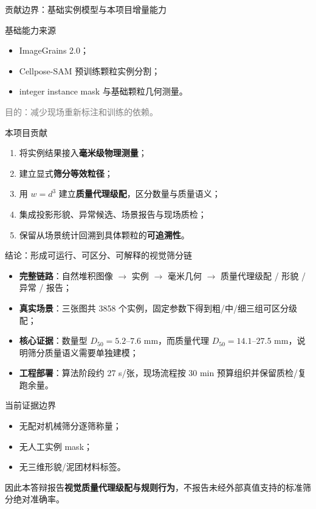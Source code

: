 \documentclass[UTF8,aspectratio=169,11pt]{ctexbeamer}
\newcommand{\key}[1]{\textcolor{accentblue}{\textbf{#1}}}
\newcommand{\smallgray}[1]{{\scriptsize\textcolor{gray}{#1}}}
\begin{document}
\begin{frame}{贡献边界：基础实例模型与本项目增量能力}
\begin{block}{基础能力来源}
\small
\begin{itemize}
  \item ImageGrains 2.0；
  \item Cellpose-SAM 预训练颗粒实例分割；
  \item integer instance mask 与基础颗粒几何测量。
\end{itemize}
\end{block}
\smallgray{目的：减少现场重新标注和训练的依赖。}
\vspace{0.4em}

\begin{alertblock}{本项目贡献}
\small
\begin{enumerate}
  \item 将实例结果接入\textbf{毫米级物理测量}；
  \item 建立显式\textbf{筛分等效粒径}；
  \item 用 $w=d^3$ 建立\textbf{质量代理级配}，区分数量与质量语义；
  \item 集成投影形貌、异常候选、场景报告与现场质检；
  \item 保留从场景统计回溯到具体颗粒的\textbf{可追溯性}。
\end{enumerate}
\end{alertblock}
\end{frame}

\begin{frame}{结论：形成可运行、可区分、可解释的视觉筛分链}
\begin{itemize}\small
  \item \key{完整链路}：自然堆积图像 $\rightarrow$ 实例 $\rightarrow$ 毫米几何 $\rightarrow$ 质量代理级配 / 形貌 / 异常 / 报告；
  \item \key{真实场景}：三张图共 3858 个实例，固定参数下得到粗/中/细三组可区分级配；
  \item \key{核心证据}：数量型 $D_{50}=5.2$--$7.6$ mm，而质量代理 $D_{50}=14.1$--$27.5$ mm，说明筛分质量语义需要单独建模；
  \item \key{工程部署}：算法阶段约 27 s/张，现场流程按 30 min 预算组织并保留质检/复跑余量。
\end{itemize}
\vspace{0.4em}

\begin{alertblock}{当前证据边界}
\footnotesize
\begin{itemize}
  \item 无配对机械筛分逐筛称量；
  \item 无人工实例 mask；
  \item 无三维形貌/泥团材料标签。
\end{itemize}
因此本答辩报告\textbf{视觉质量代理级配与规则行为}，不报告未经外部真值支持的标准筛分绝对准确率。
\end{alertblock}
\end{frame}
\end{document}

